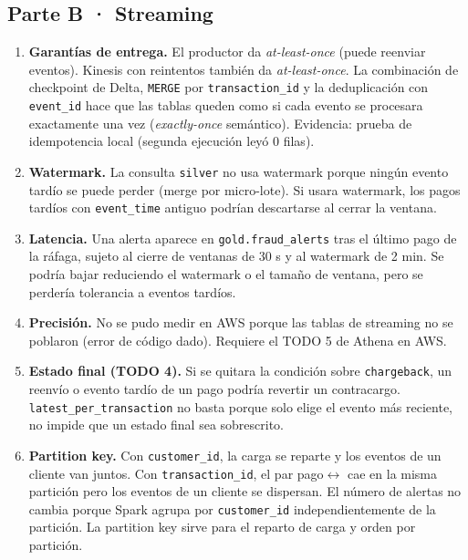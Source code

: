 ﻿\documentclass[11pt,a4paper]{article}
\begin{document}
\subsection{Parte B · Streaming}

\begin{enumerate}[label=Q\arabic*., leftmargin=*, start=7]
  \item \textbf{Garantías de entrega.} El productor da \emph{at-least-once} (puede reenviar eventos). Kinesis con reintentos también da \emph{at-least-once}. La combinación de checkpoint de Delta, \texttt{MERGE} por \texttt{transaction\_id} y la deduplicación con \texttt{event\_id} hace que las tablas queden como si cada evento se procesara exactamente una vez (\emph{exactly-once} semántico). Evidencia: prueba de idempotencia local (segunda ejecución leyó 0 filas).
  
  \item \textbf{Watermark.} La consulta \texttt{silver} no usa watermark porque ningún evento tardío se puede perder (merge por micro-lote). Si usara watermark, los pagos tardíos con \texttt{event\_time} antiguo podrían descartarse al cerrar la ventana.
  
  \item \textbf{Latencia.} Una alerta aparece en \texttt{gold.fraud\_alerts} tras el último pago de la ráfaga, sujeto al cierre de ventanas de 30 s y al watermark de 2 min. Se podría bajar reduciendo el watermark o el tamaño de ventana, pero se perdería tolerancia a eventos tardíos.
  
  \item \textbf{Precisión.} No se pudo medir en AWS porque las tablas de streaming no se poblaron (error de código dado). Requiere el TODO 5 de Athena en AWS.
  
  \item \textbf{Estado final (TODO 4).} Si se quitara la condición sobre \texttt{chargeback}, un reenvío o evento tardío de un pago podría revertir un contracargo. \texttt{latest\_per\_transaction} no basta porque solo elige el evento más reciente, no impide que un estado final sea sobrescrito.
  
  \item \textbf{Partition key.} Con \texttt{customer\_id}, la carga se reparte y los eventos de un cliente van juntos. Con \texttt{transaction\_id}, el par pago$\leftrightarrow$ cae en la misma partición pero los eventos de un cliente se dispersan. El número de alertas no cambia porque Spark agrupa por \texttt{customer\_id} independientemente de la partición. La partition key sirve para el reparto de carga y orden por partición.
  

\end{enumerate}
\end{document}

